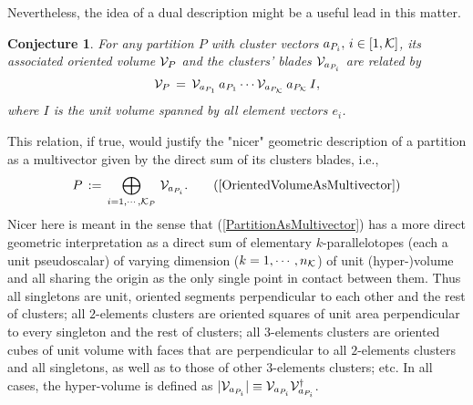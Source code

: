 \documentclass[twocolumn,aps,sort,nofootinbib]{revtex4}
\newtheorem{conjecture}{Conjecture}
\begin{document}
Nevertheless, the idea of a dual description might be a useful lead in this matter.
\begin{conjecture}
For any partition $P$ with cluster vectors $a_{P_i},\,i\in[1,{\cal K}]$, its associated
oriented volume ${\cal V}_P$ and the clusters' blades ${\cal V}_{a_{P_i}}$ are related
by
\begin{equation}
{\cal V}_P\,=\,{\cal V}_{a_{P_1}}\,a_{P_1}\cdots{\cal V}_{a_{P_{\cal K}}}\,a_{P_{\cal K}}\,I,
\end{equation}
\label{RelationBetweenOrientedVolumeAndClusterBlade}
where $I$ is the unit volume spanned by all element vectors ${e_i}$.
\end{conjecture}

This relation, if true, would justify the "nicer" geometric description of a 
partition as a multivector given by the direct sum of its clusters blades, i.e.,
\begin{equation*}
P\,:=\,\bigoplus_{i=1,\cdots ,{\cal K}_P}\,{\cal V}_{a_{P_i}}. \tag{\ref{OrientedVolumeAsMultivector}}
\label{PartitionAsMultivector}
\end{equation*}
Nicer here is meant in the sense that (\ref{PartitionAsMultivector}) has a more direct
geometric interpretation as a direct sum of elementary $k$-parallelotopes 
(each a unit pseudoscalar) of varying dimension
($k=1,\cdots ,n_{\cal K}$) of unit (hyper-)volume and all sharing the origin as the 
only single point in contact between them. 
Thus all singletons are unit, oriented segments perpendicular to each other and the rest of clusters;
all $2$-elements clusters are oriented squares of unit area perpendicular to every singleton and
the rest of clusters; all $3$-elements clusters are oriented cubes of unit volume with
faces that are perpendicular to all $2$-elements clusters and all singletons, as well as to
those of other $3$-elements clusters; etc. In all cases, the hyper-volume is defined as
$|{\cal V}_{a_{P_i}}|\equiv {\cal V}_{a_{P_i}}{\cal V}_{a_{P_i}}^\dagger$.
\end{document}
